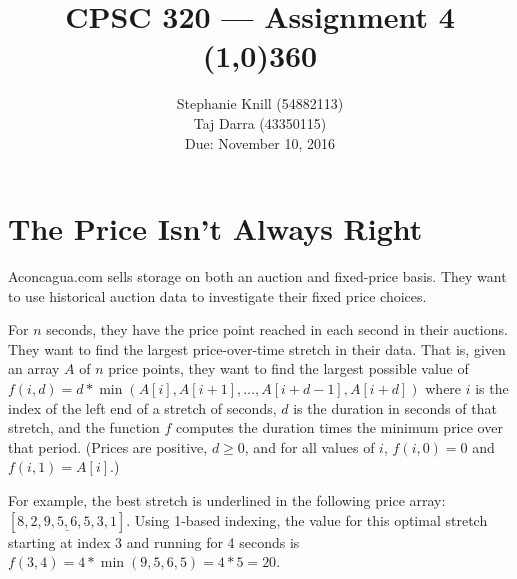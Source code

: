 \documentclass[11pt, oneside]{article}   	%
\theoremstyle{definition}
\theoremstyle{remark}
\begin{document}
\title{CPSC 320 --- Assignment 4 \\
\line(1,0){360} \\              %
}
\author{
Stephanie Knill (54882113) \\
Taj Darra (43350115) \\
Due: November 10, 2016}

\date{}                   %
\maketitle




\section{The Price Isn't Always Right}
\label{sec-1}

Aconcagua.com sells storage on both an auction and fixed-price
basis. They want to use historical auction data to investigate their
fixed price choices.

For $n$ seconds, they have the price point reached in each second in
their auctions. They want to find the largest price-over-time stretch
in their data. That is, given an array $A$ of $n$ price points, they
want to find the largest possible value of $f(i,d) =
d*\min(A[i],A[i+1],\ldots,A[i+d-1],A[i+d])$ where $i$ is the index of
the left end of a stretch of seconds, $d$ is the duration in seconds
of that stretch, and the function $f$ computes the duration times the
minimum price over that period. (Prices are positive, $d \geq 0$, and
for all values of $i$, $f(i,0) = 0$ and $f(i,1) = A[i]$.)

For example, the best stretch is underlined in the following price
array: $[8, 2, \underline{9, 5, 6, 5}, 3, 1]$. Using 1-based indexing,
the value for this optimal stretch starting at index 3 and running for
4 seconds is $f(3,4) = 4*\min(9, 5, 6, 5) = 4*5 = 20$.
\end{document}
